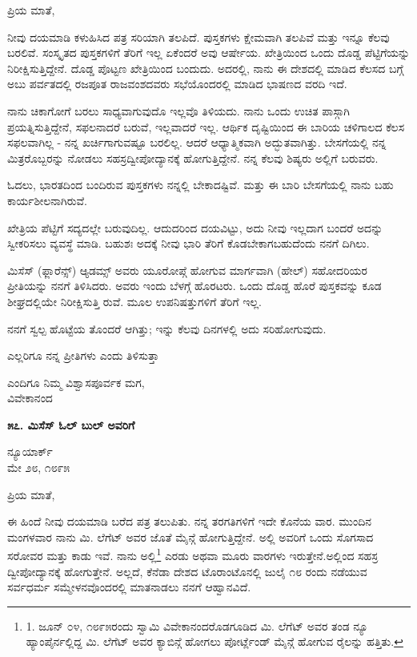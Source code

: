 ಪ್ರಿಯ ಮಾತೆ,

ನೀವು ದಯಮಾಡಿ ಕಳುಹಿಸಿದ ಪತ್ರ ಸರಿಯಾಗಿ ತಲಪಿದೆ. ಪುಸ್ತಕಗಳು ಕ್ಷೇಮವಾಗಿ ತಲಪಿವೆ ಮತ್ತು ಇನ್ನೂ ಕೆಲವು ಬರಲಿವೆ. ಸಂಸ್ಕೃತದ ಪುಸ್ತಕಗಳಿಗೆ ತೆರಿಗೆ ಇಲ್ಲ ಏಕೆಂದರೆ ಅವು ಆರ್ಷೇಯ. ಖೇತ್ರಿಯಿಂದ ಒಂದು ದೊಡ್ಡ ಪೆಟ್ಟಿಗೆಯನ್ನು ನಿರೀಕ್ಷಿಸುತ್ತಿದ್ದೇನೆ. ದೊಡ್ಡ ಪೊಟ್ಟಣ ಖೇತ್ರಿಯಿಂದ ಬಂದುದು. ಅದರಲ್ಲಿ, ನಾನು ಈ ದೇಶದಲ್ಲಿ ಮಾಡಿದ ಕೆಲಸದ ಬಗ್ಗೆ ಅಬು ಪರ್ವತದಲ್ಲಿ ರಜಪೂತ ರಾಜವಂಶದವರು ಸಭೆಯೊಂದರಲ್ಲಿ ಮಾಡಿದ ಭಾಷಣದ ವರದಿ ಇದೆ.

ನಾನು ಚಿಕಾಗೋಗೆ ಬರಲು ಸಾಧ್ಯವಾಗುವುದೊ ಇಲ್ಲವೊ ತಿಳಿಯದು. ನಾನು ಒಂದು ಉಚಿತ ಪಾಸ್ಗಾಗಿ ಪ್ರಯತ್ನಿಸುತ್ತಿದ್ದೇನೆ, ಸಫಲನಾದರೆ ಬರುವೆ, ಇಲ್ಲವಾದರೆ ಇಲ್ಲ. ಆರ್ಥಿಕ ದೃಷ್ಟಿಯಿಂದ ಈ ಬಾರಿಯ ಚಳಿಗಾಲದ ಕೆಲಸ ಸಫಲವಾಗಿಲ್ಲ - ನನ್ನ ಖರ್ಚಿಗಾಗುವಷ್ಟೂ ಬರಲಿಲ್ಲ. ಆದರೆ ಆಧ್ಯಾತ್ಮಿಕವಾಗಿ ಅದ್ಭುತವಾಗಿತ್ತು. ಬೇಸಗೆಯಲ್ಲಿ ನನ್ನ ಮಿತ್ರರೊಬ್ಬರನ್ನು ನೋಡಲು ಸಹಸ್ರದ್ವೀಪೋದ್ಯಾನಕ್ಕೆ ಹೋಗುತ್ತಿದ್ದೇನೆ. ನನ್ನ ಕೆಲವು ಶಿಷ್ಯರು ಅಲ್ಲಿಗೆ ಬರುವರು.

ಓದಲು, ಭಾರತದಿಂದ ಬಂದಿರುವ ಪುಸ್ತಕಗಳು ನನ್ನಲ್ಲಿ ಬೇಕಾದಷ್ಟಿವೆ. ಮತ್ತು ಈ ಬಾರಿ ಬೇಸಗೆಯಲ್ಲಿ ನಾನು ಬಹು ಕಾರ್ಯಶೀಲನಾಗಿರುವೆ.

ಖೇತ್ರಿಯ ಪೆಟ್ಟಿಗೆ ಸದ್ಯದಲ್ಲೇ ಬರುವುದಿಲ್ಲ. ಆದುದರಿಂದ ದಯವಿಟ್ಟು, ಅದು ನೀವು ಇಲ್ಲದಾಗ ಬಂದರೆ ಅದನ್ನು ಸ್ವೀಕರಿಸಲು ವ್ಯವಸ್ಥೆ ಮಾಡಿ. ಬಹುಶಃ ಅದಕ್ಕೆ ನೀವು ಭಾರಿ ತೆರಿಗೆ ಕೊಡಬೇಕಾಗಬಹುದೆಂದು ನನಗೆ ದಿಗಿಲು.

ಮಿಸೆಸ್ (ಫ್ಲಾರೆನ್ಸ್) ಆ್ಯಡಮ್ಸ್ ಅವರು ಯೂರೋಪ್ಗೆ ಹೋಗುವ ಮಾರ್ಗವಾಗಿ (ಹೇಲ್) ಸಹೋದರಿಯರ ಪ್ರೀತಿಯನ್ನು ನನಗೆ ತಿಳಿಸಿದರು. ಅವರು ಇಂದು ಬೆಳಗ್ಗೆ ಹೊರಟರು. ಒಂದು ದೊಡ್ಡ ಹೊರೆ ಪುಸ್ತಕವನ್ನು ಕೂಡ ಶೀಘ್ರದಲ್ಲಿಯೇ ನಿರೀಕ್ಷಿಸುತ್ತಿ ರುವೆ. ಮೂಲ ಉಪನಿಷತ್ತುಗಳಿಗೆ ತೆರಿಗೆ ಇಲ್ಲ.

ನನಗೆ ಸ್ವಲ್ಪ ಹೊಟ್ಟೆಯ ತೊಂದರೆ ಆಗಿತ್ತು; ಇನ್ನು ಕೆಲವು ದಿನಗಳಲ್ಲಿ ಅದು ಸರಿಹೋಗುವುದು.

ಎಲ್ಲರಿಗೂ ನನ್ನ ಪ್ರೀತಿಗಳು ಎಂದು ತಿಳಿಸುತ್ತಾ

\begin{flushright}
ಎಂದಿಗೂ ನಿಮ್ಮ ವಿಶ್ವಾಸಪೂರ್ವಕ ಮಗ,\\ವಿವೇಕಾನಂದ
\end{flushright}

\begin{center}
\textbf{೫೭. ಮಿಸೆಸ್ ಓಲ್ ಬುಲ್ ಅವರಿಗೆ}
\end{center}

\begin{flushright}
ನ್ಯೂಯಾರ್ಕ್\\ಮೇ ೨೮, ೧೮೯೫
\end{flushright}

ಪ್ರಿಯ ಮಾತೆ,

ಈ ಹಿಂದೆ ನೀವು ದಯಮಾಡಿ ಬರೆದ ಪತ್ರ ತಲುಪಿತು. ನನ್ನ ತರಗತಿಗಳಿಗೆ ಇದೇ ಕೊನೆಯ ವಾರ. ಮುಂದಿನ ಮಂಗಳವಾರ ನಾನು ಮಿ. ಲೆಗೆಟ್ ಅವರ ಜೊತೆ ಮೈನ್ಗೆ ಹೋಗುತ್ತಿದ್ದೇನೆ. ಅಲ್ಲಿ ಅವರಿಗೆ ಒಂದು ಸೊಗಸಾದ ಸರೋವರ ಮತ್ತು ಕಾಡು ಇವೆ. ನಾನು ಅಲ್ಲಿ\footnote{1. ಜೂನ್ ೦೪, ೧೮೯೫ರಂದು ಸ್ವಾಮಿ ವಿವೇಕಾನಂದರೊಡಗೂಡಿದ ಮಿ. ಲೆಗೆಟ್ ಅವರ ತಂಡ ನ್ಯೂ ಹ್ಯಾಂಪೈರ್ನಲ್ಲಿದ್ದ ಮಿ. ಲೆಗೆಟ್ ಅವರ ಕ್ಯಾಬಿನ್ಗೆ ಹೋಗಲು ಪೋರ್ಟ್ಲೆಂಡ್ ಮೈನ್ಗೆ ಹೋಗುವ ರೈಲನ್ನು ಹತ್ತಿತು.} ಎರಡು ಅಥವಾ ಮೂರು ವಾರಗಳು ಇರುತ್ತೇನೆ.ಅಲ್ಲಿಂದ ಸಹಸ್ರ ದ್ವೀಪೋದ್ಯಾನಕ್ಕೆ ಹೋಗುತ್ತೇನೆ. ಅಲ್ಲದೆ, ಕೆನೆಡಾ ದೇಶದ ಟೊರಾಂಟೊನಲ್ಲಿ ಜುಲೈ ೧೮ ರಂದು ನಡೆಯುವ ಸರ್ವಧರ್ಮ ಸಮ್ಮೇಳನವೊಂದರಲ್ಲಿ ಮಾತನಾಡಲು ನನಗೆ ಆಹ್ವಾನವಿದೆ.

